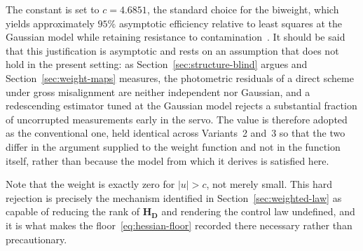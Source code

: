 The constant is set to $c=4.6851$, the standard choice for the biweight,
which yields approximately $95\%$ asymptotic efficiency relative to least
squares at the Gaussian model while retaining resistance to
contamination~\cite{key50}. It should be said that this justification is
asymptotic and rests on an assumption that does not hold in the present
setting: as Section~\ref{sec:structure-blind} argues and
Section~\ref{sec:weight-maps} measures, the photometric residuals of a
direct scheme under gross misalignment are neither independent nor Gaussian,
and a redescending estimator tuned at the Gaussian model rejects a substantial
fraction of uncorrupted measurements early in the servo. The value is
therefore adopted as the conventional one, held identical across Variants~2
and~3 so that the two differ in the argument supplied to the weight function
and not in the function itself, rather than because the model from which it
derives is satisfied here.

Note that the weight is exactly zero for $\lvert u\rvert>c$, not merely small.
This hard rejection is precisely the mechanism identified in
Section~\ref{sec:weighted-law} as capable of reducing the rank of
$\mathbf{H}_{\mathbf{D}}$ and rendering the control law undefined, and it is
what makes the floor~\eqref{eq:hessian-floor} recorded there necessary rather
than precautionary.

